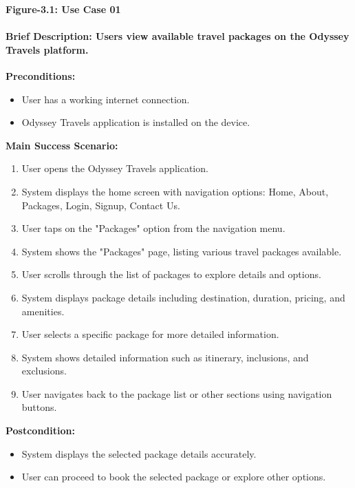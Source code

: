 \documentclass{scrreprt}
\begin{document}
\begin{center}
    \parbox{0.8\textwidth}{ 
        \centering
        \textbf{Figure-3.1: Use Case 01}
    }
\end{center}

\paragraph {\textnormal{Brief Description: 
Users view available travel packages on the Odyssey Travels platform.}}

\textbf{Preconditions:}
\begin{itemize}
    \item User has a working internet connection.
    \item Odyssey Travels application is installed on the device.
\end{itemize}

\textbf{Main Success Scenario:}
\begin{enumerate}
    \item User opens the Odyssey Travels application.
    \item System displays the home screen with navigation options: Home, About, Packages, Login, Signup, Contact Us.
    \item User taps on the "Packages" option from the navigation menu.
    \item System shows the "Packages" page, listing various travel packages available.
    \item User scrolls through the list of packages to explore details and options.
    \item System displays package details including destination, duration, pricing, and amenities.
    \item User selects a specific package for more detailed information.
    \item System shows detailed information such as itinerary, inclusions, and exclusions.
    \item User navigates back to the package list or other sections using navigation buttons.
\end{enumerate}

\textbf{Postcondition:}
\begin{itemize}
    \item System displays the selected package details accurately.
    \item User can proceed to book the selected package or explore other options.
\end{itemize}
\end{document}
